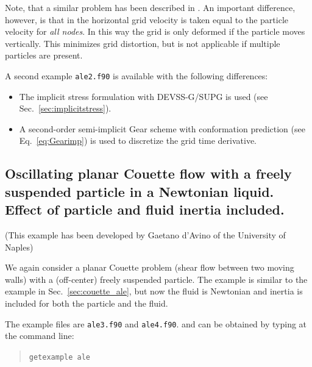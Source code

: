 Note, that a similar problem has been described in \cite{DAvino10a}. An
important difference, however, is that in \cite{DAvino10a} the horizontal
grid velocity is taken equal to the particle velocity for \emph{all nodes}. In
this way the grid is only deformed if the particle moves vertically. This 
minimizes grid distortion, but is not applicable if multiple particles are
present.
 
A second example \texttt{ale2.f90} is available with the following differences:
\begin{itemize}
   \item 
     The implicit stress formulation with DEVSS-G/SUPG is used (see
     Sec.~\ref{sec:implicitstress}). 
   \item
    A second-order semi-implicit Gear scheme with conformation prediction
    (see Eq.~\eqref{eq:Gearimp}) is used to discretize the grid time
    derivative.
\end{itemize}

\subsection{Oscillating planar Couette flow with a freely suspended particle
in a Newtonian liquid. Effect of particle and fluid inertia included.}
\label{sec:couette_ale_inertia}

(This example has been developed by Gaetano d'Avino of the University of
Naples)

We again
consider a planar Couette problem (shear flow between two moving walls) with
a (off-center) freely suspended particle. The example is similar to the example
in Sec.~\ref{sec:couette_ale}, but now the fluid is Newtonian and
inertia is included for both the particle and the fluid. 

The example files are \texttt{ale3.f90} and \texttt{ale4.f90}.
and can be obtained by typing at the
command line:
\medskip
\begin{quote}
   \texttt{getexample ale}
\end{quote}

